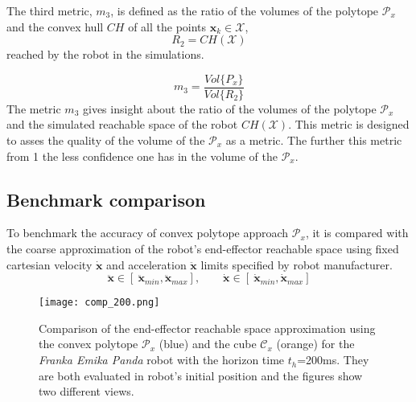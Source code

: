 The third metric, $m_3$, is defined as the ratio of the volumes of the polytope $\mathcal{P}_x$ and the convex hull $CH$ of all the points $\bm{x}_k\in\mathcal{X}$, $$ R_2 = CH(\mathcal{X})$$ reached by the robot in the simulations.

\begin{equation}
    m_3 = \frac{Vol\{P_x\}}{Vol\{ R_2 \}}
\end{equation}
The metric $m_3$ gives insight about the ratio of the volumes of the polytope $\mathcal{P}_x$ and the simulated reachable space of the robot $CH(\mathcal{X})$. This metric is designed to asses the quality of the volume of the $\mathcal{P}_x$ as a metric. The further this metric from 1 the less confidence one has in the volume of the $\mathcal{P}_x$.

\subsection{Benchmark comparison}
\vspace{-0.1cm}
To benchmark the accuracy of convex polytope approach $\mathcal{P}_x$, it is compared with the coarse approximation of the robot's end-effector reachable space using fixed cartesian velocity $\dot{\bm{x}}$ and acceleration $\ddot{\bm{x}}$ limits specified by robot manufacturer.
\begin{equation}
    \ddot{\bm{x}}\in [~ \ddot{\bm{x}}_{min},  \ddot{\bm{x}}_{max}], \qquad \dot{\bm{x}} \in [~ \dot{\bm{x}}_{min},  \dot{\bm{x}}_{max}]
    \label{eq:limits_cart}
\end{equation}

\begin{figure}[!t]
    \centering
    \texttt{[image: comp\_200.png]}
    \caption{Comparison of the end-effector reachable space approximation using the convex polytope $\mathcal{P}_x$ (blue) and the cube $\mathcal{C}_x$ (orange) for the \textit{Franka Emika Panda} robot with the horizon time $t_h$=200ms. They are both evaluated in robot's initial position and the figures show two different views.}
    \label{fig:cube}
\vspace{-0.3cm}
\end{figure}


